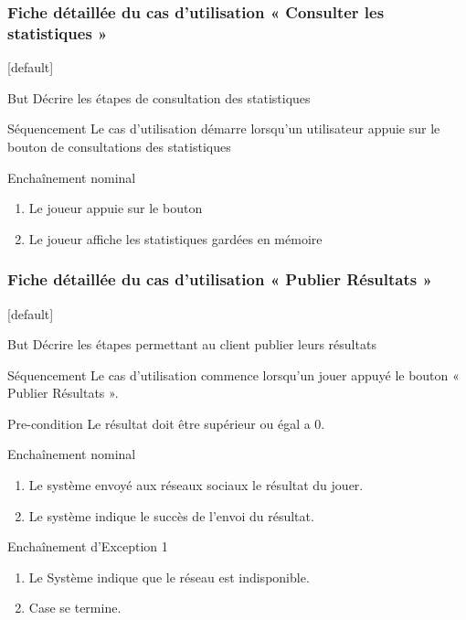 \documentclass{beamer}
\begin{document}
\begin{frame}
  \frametitle{Fiche détaillée du cas d'utilisation « Consulter les statistiques »}
  [default]
  \begin{block}{\footnotesize{But}}
    \scriptsize{Décrire les étapes de consultation des statistiques}
  \end{block}
  \pause
  \begin{block}{\footnotesize{Séquencement}}
    \scriptsize{Le cas d'utilisation démarre lorsqu’un utilisateur appuie sur le bouton de consultations des statistiques}
  \end{block}
  \pause
  \begin{block}{\footnotesize{Enchaînement nominal}}
    \begin{enumerate}    
      [circle]
      \item
        \scriptsize{Le joueur appuie sur le bouton}
      \item
        \scriptsize{Le joueur affiche les statistiques gardées en mémoire}
    \end{enumerate}
  \pause 
  \end{block}
\end{frame}

\begin{frame}
  \frametitle{Fiche détaillée du cas d'utilisation « Publier Résultats »}
  [default]
  \begin{block}{\footnotesize{But}}
    \scriptsize{Décrire les étapes permettant au client publier leurs résultats}
  \end{block}
  \pause
  \begin{block}{\footnotesize{Séquencement}}
    \scriptsize{Le cas d'utilisation commence lorsqu’un jouer appuyé le bouton « Publier Résultats ».}
  \end{block}
  \pause
  \begin{block}{\footnotesize{Pre-condition}}
    \scriptsize{Le résultat doit être supérieur ou égal a 0.}
  \end{block}
  \pause
  \begin{block}{\footnotesize{Enchaînement nominal}}
    \begin{enumerate}    
      [circle]
      \item
        \scriptsize{Le système envoyé aux réseaux sociaux le résultat du jouer.}
      \item
        \scriptsize{Le système indique le succès de l'envoi du résultat. }
    \end{enumerate}
  \end{block}
  \pause
  \begin{block}{\footnotesize{Enchaînement d’Exception 1}}
    \begin{enumerate}
      \item
        \scriptsize{Le Système indique que le réseau est indisponible.}
      \item
        \scriptsize{Case se termine.}
    \end{enumerate}
  \end{block}
\end{frame}
\end{document}
